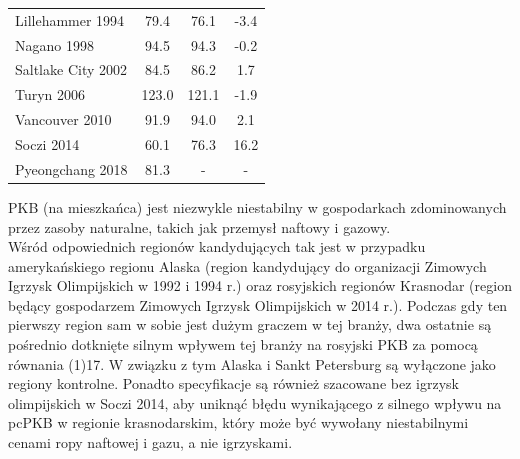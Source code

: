 \documentclass[12pt]{article}
\begin{document}
\begin{table}[ht]
\begin{tabular}{@{}lccc@{}}
            Lillehammer 1994           & 79.4                               & 76.1                                   & -3.4                          \\
            Nagano 1998                & 94.5                               & 94.3                                   & -0.2                          \\
            Saltlake City 2002         & 84.5                               & 86.2                                   & 1.7                           \\
            Turyn 2006                 & 123.0                              & 121.1                                  & -1.9                          \\
            Vancouver 2010             & 91.9                               & 94.0                                   & 2.1                           \\
            Soczi 2014                 & 60.1                               & 76.3                                   & 16.2                          \\
            Pyeongchang 2018           & 81.3                               & -                                      & -                             \\ \bottomrule
        \end{tabular}
        \label{Tab:pcPKB}
    \end{table}

    PKB (na mieszkańca) jest niezwykle niestabilny w gospodarkach zdominowanych przez zasoby naturalne, takich jak przemysł naftowy i gazowy.\\
    
    Wśród odpowiednich regionów kandydujących tak jest w przypadku amerykańskiego regionu Alaska (region kandydujący do organizacji Zimowych Igrzysk Olimpijskich w 1992 i 1994 r.) oraz rosyjskich regionów Krasnodar (region będący gospodarzem Zimowych Igrzysk Olimpijskich w 2014 r.). Podczas gdy ten pierwszy region sam w sobie jest dużym graczem w tej branży, dwa ostatnie są pośrednio dotknięte silnym wpływem tej branży na rosyjski PKB za pomocą równania (1)17. W związku z tym Alaska i Sankt Petersburg są wyłączone jako regiony kontrolne. Ponadto specyfikacje są również szacowane bez igrzysk olimpijskich w Soczi 2014, aby uniknąć błędu wynikającego z silnego wpływu na pcPKB w regionie krasnodarskim, który może być wywołany niestabilnymi cenami ropy naftowej i gazu, a nie igrzyskami.\\
    
\end{document}
